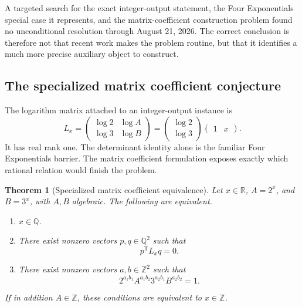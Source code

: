 \documentclass[11pt,oneside]{article}
\newtheorem{theorem}{Theorem}[section]
\theoremstyle{definition}
\theoremstyle{remark}
\newcommand{\Z}{\mathbb Z}
\newcommand{\Q}{\mathbb Q}
\newcommand{\R}{\mathbb R}
\begin{document}
A targeted search for the exact integer-output statement, the Four Exponentials special case
it represents, and the matrix-coefficient construction problem found no unconditional
resolution through August 21, 2026.  The correct conclusion is therefore not that recent
work makes the problem routine, but that it identifies a much more precise auxiliary object
to construct.

\subsection{The specialized matrix coefficient conjecture}
\label{sec:sparse-matrix}

The logarithm matrix attached to an integer-output instance is
\[
  L_x=
  \begin{pmatrix}
    \log2 & \log A\\
    \log3 & \log B
  \end{pmatrix}
  =
  \begin{pmatrix}\log2\\ \log3\end{pmatrix}
  \begin{pmatrix}1&x\end{pmatrix}.
\]
It has real rank one.  The determinant identity alone is the familiar Four Exponentials
barrier.  The matrix coefficient formulation exposes exactly which rational relation would
finish the problem.

\begin{theorem}[Specialized matrix coefficient equivalence]
\label{thm:specialized-mcc}
Let $x\in\R$, $A=2^x$, and $B=3^x$, with $A,B$ algebraic.  The following are equivalent.
\begin{enumerate}
\item $x\in\Q$.
\item There exist nonzero vectors $p,q\in\Q^2$ such that
\[
  p^{\mathsf T}L_xq=0.
\]
\item There exist nonzero vectors $a,b\in\Z^2$ such that
\[
  2^{a_1b_1}A^{a_1b_2}3^{a_2b_1}B^{a_2b_2}=1.
\]
\end{enumerate}
If in addition $A\in\Z$, these conditions are equivalent to $x\in\Z$.
\end{theorem}
\end{document}
